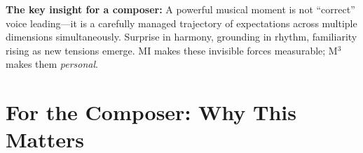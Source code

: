 \documentclass[10pt,a4paper]{article}
\begin{document}
\vspace{4pt}

\begin{tcolorbox}[
  enhanced, colback=mist, colframe=deep!15, boxrule=0.3pt, arc=3pt,
  left=12pt, right=12pt, top=6pt, bottom=6pt
]
\small\sffamily\color{deep}
\textbf{The key insight for a composer:}\; A powerful musical moment is not ``correct'' voice leading---it is a carefully managed trajectory of expectations across multiple dimensions simultaneously. Surprise in harmony, grounding in rhythm, familiarity rising as new tensions emerge. MI makes these invisible forces measurable; M$^3$ makes them \emph{personal}.
\end{tcolorbox}

\newpage

\section{For the Composer: Why This Matters}

\vspace{4pt}
\end{document}
